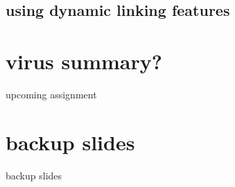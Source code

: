 

\subsection{using dynamic linking features}



\section{virus summary?}



\begin{frame}{upcoming assignment}
\end{frame}



\section{backup slides}
\begin{frame}{backup slides}
\end{frame}


